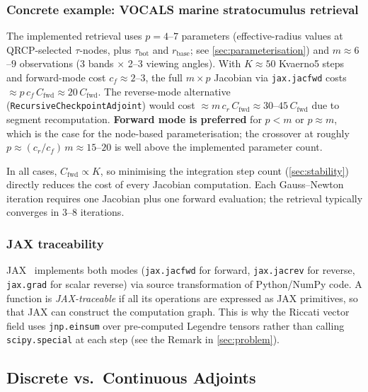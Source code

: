 \documentclass[11pt,a4paper]{article}
\theoremstyle{definition}
\begin{document}
\subsubsection{Concrete example: VOCALS marine stratocumulus retrieval}

The implemented retrieval uses $p = 4$--$7$ parameters (effective-radius
values at QRCP-selected $\tau$-nodes, plus $\tau_{\mathrm{bot}}$ and
$r_{\mathrm{base}}$; see \cref{sec:parameterisation}) and $m \approx 6$--$9$
observations (3 bands $\times$ 2--3 viewing angles).  With $K \approx 50$
Kvaerno5 steps and forward-mode cost $c_f \approx 2$--$3$, the full
$m \times p$ Jacobian via \texttt{jax.jacfwd} costs
$\approx p\,c_f\,C_{\mathrm{fwd}} \approx 20\,C_{\mathrm{fwd}}$.  The
reverse-mode alternative (\texttt{RecursiveCheckpointAdjoint}) would cost
$\approx m\,c_r\,C_{\mathrm{fwd}} \approx 30$--$45\,C_{\mathrm{fwd}}$ due
to segment recomputation.  \textbf{Forward mode is preferred} for
$p < m$ or $p \approx m$, which is the case for the node-based
parameterisation; the crossover at roughly
$p \approx (c_r / c_f)\, m \approx 15$--$20$ is well above the
implemented parameter count.

In all cases, $C_{\mathrm{fwd}} \propto K$, so minimising the
integration step count (\cref{sec:stability}) directly reduces the cost
of every Jacobian computation.  Each Gauss--Newton iteration requires one
Jacobian plus one forward evaluation; the retrieval typically converges in
3--8 iterations.

\subsubsection{JAX traceability}

JAX~\cite{jax2018github} implements both modes (\texttt{jax.jacfwd} for
forward, \texttt{jax.jacrev} for reverse, \texttt{jax.grad} for scalar
reverse) via source transformation of Python/NumPy code.  A function is
\emph{JAX-traceable} if all its operations are expressed as JAX
primitives, so that JAX can construct the computation graph.  This is
why the Riccati vector field uses \texttt{jnp.einsum} over pre-computed
Legendre tensors rather than calling \texttt{scipy.special} at each
step (see the Remark in \cref{sec:problem}).

\subsection{Discrete vs.\ Continuous Adjoints}\label{sec:disc-vs-cont}
\end{document}
